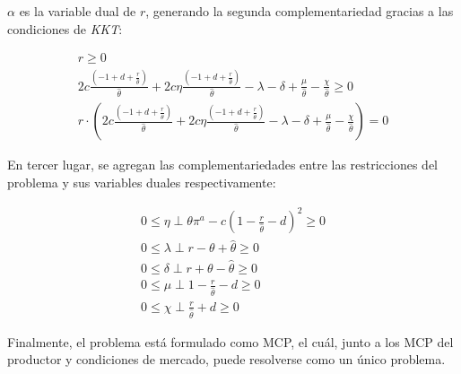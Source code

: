 $\alpha$ es la variable dual de $r$, generando la segunda complementariedad gracias a las condiciones de \textit{KKT}:

\begin{footnotesize}
\begin{align}
    r \geq 0 \\
   2c\frac{(-1+d+\frac{r}{\hat{\theta}})}{\hat{\theta}} + 2c\eta \frac{(-1+d+\frac{r}{\hat{\theta}})}{\hat{\theta}} - \lambda - \delta + \frac{\mu}{\hat{\theta}} - \frac{\chi}{\hat{\theta}} \geq 0\\
   r \cdot (2c\frac{(-1+d+\frac{r}{\hat{\theta}})}{\hat{\theta}} + 2c\eta \frac{(-1+d+\frac{r}{\hat{\theta}})}{\hat{\theta}} - \lambda - \delta + \frac{\mu}{\hat{\theta}} - \frac{\chi}{\hat{\theta}})=0
\end{align}
\end{footnotesize}

En tercer lugar, se agregan las complementariedades entre las restricciones del problema y sus variables duales respectivamente:

\begin{footnotesize}
\begin{align}
0 \leq \eta \perp \theta \pi^a - c(1-\frac{r}{\hat{\theta}}-d)^2 \geq 0 \\
0 \leq \lambda \perp r - \theta + \hat{\theta} \geq 0 \\
0 \leq \delta \perp r + \theta - \hat{\theta} \geq 0\\
0 \leq \mu \perp 1-\frac{r}{\hat{\theta}}-d \geq 0\\
0 \leq\chi \perp \frac{r}{\hat{\theta}} + d \geq 0 
\end{align}
\end{footnotesize}

Finalmente, el problema está formulado como MCP, el cuál, junto a los MCP del productor y condiciones de mercado, puede resolverse como un único problema.